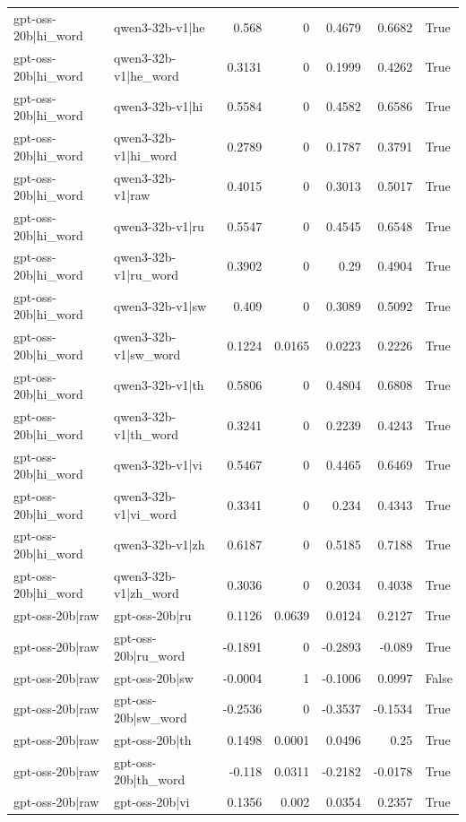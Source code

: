 \begin{table}
\begin{tabular}{l l r r r r l}
gpt-oss-20b|hi_word & qwen3-32b-v1|he & 0.568 & 0 & 0.4679 & 0.6682 & True \\
gpt-oss-20b|hi_word & qwen3-32b-v1|he_word & 0.3131 & 0 & 0.1999 & 0.4262 & True \\
gpt-oss-20b|hi_word & qwen3-32b-v1|hi & 0.5584 & 0 & 0.4582 & 0.6586 & True \\
gpt-oss-20b|hi_word & qwen3-32b-v1|hi_word & 0.2789 & 0 & 0.1787 & 0.3791 & True \\
gpt-oss-20b|hi_word & qwen3-32b-v1|raw & 0.4015 & 0 & 0.3013 & 0.5017 & True \\
gpt-oss-20b|hi_word & qwen3-32b-v1|ru & 0.5547 & 0 & 0.4545 & 0.6548 & True \\
gpt-oss-20b|hi_word & qwen3-32b-v1|ru_word & 0.3902 & 0 & 0.29 & 0.4904 & True \\
gpt-oss-20b|hi_word & qwen3-32b-v1|sw & 0.409 & 0 & 0.3089 & 0.5092 & True \\
gpt-oss-20b|hi_word & qwen3-32b-v1|sw_word & 0.1224 & 0.0165 & 0.0223 & 0.2226 & True \\
gpt-oss-20b|hi_word & qwen3-32b-v1|th & 0.5806 & 0 & 0.4804 & 0.6808 & True \\
gpt-oss-20b|hi_word & qwen3-32b-v1|th_word & 0.3241 & 0 & 0.2239 & 0.4243 & True \\
gpt-oss-20b|hi_word & qwen3-32b-v1|vi & 0.5467 & 0 & 0.4465 & 0.6469 & True \\
gpt-oss-20b|hi_word & qwen3-32b-v1|vi_word & 0.3341 & 0 & 0.234 & 0.4343 & True \\
gpt-oss-20b|hi_word & qwen3-32b-v1|zh & 0.6187 & 0 & 0.5185 & 0.7188 & True \\
gpt-oss-20b|hi_word & qwen3-32b-v1|zh_word & 0.3036 & 0 & 0.2034 & 0.4038 & True \\
gpt-oss-20b|raw & gpt-oss-20b|ru & 0.1126 & 0.0639 & 0.0124 & 0.2127 & True \\
gpt-oss-20b|raw & gpt-oss-20b|ru_word & -0.1891 & 0 & -0.2893 & -0.089 & True \\
gpt-oss-20b|raw & gpt-oss-20b|sw & -0.0004 & 1 & -0.1006 & 0.0997 & False \\
gpt-oss-20b|raw & gpt-oss-20b|sw_word & -0.2536 & 0 & -0.3537 & -0.1534 & True \\
gpt-oss-20b|raw & gpt-oss-20b|th & 0.1498 & 0.0001 & 0.0496 & 0.25 & True \\
gpt-oss-20b|raw & gpt-oss-20b|th_word & -0.118 & 0.0311 & -0.2182 & -0.0178 & True \\
gpt-oss-20b|raw & gpt-oss-20b|vi & 0.1356 & 0.002 & 0.0354 & 0.2357 & True \\

\end{tabular}
\end{table}
